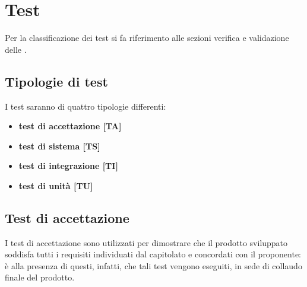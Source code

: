 \section{Test}
	Per la classificazione dei test si fa riferimento alle sezioni verifica e validazione delle .
	

	\subsection{Tipologie di test}
		I test saranno di quattro tipologie differenti:
		\begin{itemize}

			\item \textbf{test di accettazione [TA]}
			\item \textbf{test di sistema [TS]}
			\item \textbf{test di integrazione [TI]}
			\item \textbf{test di unità [TU]}

		\end{itemize}

	\subsection{Test di accettazione}
	
		I test di accettazione sono utilizzati per dimostrare che il prodotto sviluppato soddisfa tutti i requisiti individuati dal capitolato e concordati con il proponente: è alla presenza di questi, infatti, che tali test vengono eseguiti, in sede di collaudo finale del prodotto.
		
